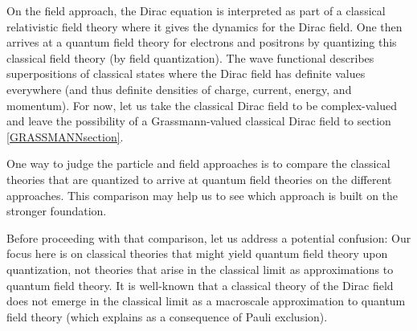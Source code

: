 \documentclass[12pt,onecolumn,secnumarabic,amsmath,amssymb,balancelastpage,nofootinbib]{article}
\begin{document}
On the field approach, the Dirac equation is interpreted as part of a classical relativistic field theory where it gives the dynamics for the Dirac field.  One then arrives at a quantum field theory for electrons and positrons by quantizing this classical field theory (by field quantization).  The wave functional describes superpositions of classical states where the Dirac field has definite values everywhere (and thus definite densities of charge, current, energy, and momentum).  For now, let us take the classical Dirac field to be complex-valued and leave the possibility of a Grassmann-valued classical Dirac field to section \ref{GRASSMANNsection}.


One way to judge the particle and field approaches is to compare the classical theories that are quantized to arrive at quantum field theories on the different approaches.  This comparison may help us to see which approach is built on the stronger foundation.

Before proceeding with that comparison, let us address a potential confusion: Our focus here is on classical theories that might yield quantum field theory upon quantization, not theories that arise in the classical limit as approximations to quantum field theory.  It is well-known that a classical theory of the Dirac field does not emerge in the classical limit as a macroscale approximation to quantum field theory (which \citealp[pg.\ 221]{duncan} explains as a consequence of Pauli exclusion).
\end{document}
